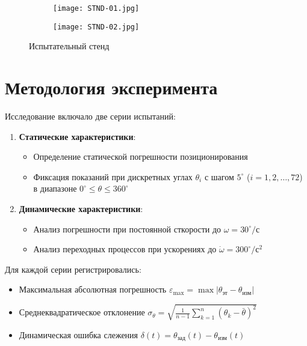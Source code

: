 \begin{figure}[!h]
  \centering
  \begin{subfigure}[b]{0.48\textwidth}
    \centering
    \texttt{[image: STND-01.jpg]} 
    \label{STND01}
  \end{subfigure}
  \hfill
  \begin{subfigure}[b]{0.48\textwidth}
    \centering
    \texttt{[image: STND-02.jpg]} 
    \label{STND02}
  \end{subfigure}

  \caption{Испытательный стенд}
  \label{STND-ISP} 
\end{figure}

\FloatBarrier
\section{Методология эксперимента}
Исследование включало две серии испытаний:

\begin{enumerate}
    \item \textbf{Статические характеристики}: 
    \begin{itemize}
        \item Определение статической погрешности позиционирования
        \item Фиксация показаний при дискретных углах $\theta_i$ с шагом $5^\circ$ ($i = 1, 2, \dots, 72$) в диапазоне $0^\circ \leq \theta \leq 360^\circ$
    \end{itemize}
    
    \item \textbf{Динамические характеристики}:
    \begin{itemize}
        \item Анализ погрешности при постоянной сткорости до $\omega = 30^\circ/\text{с}$
        \item Анализ переходных процессов при ускорениях до $\dot{\omega} = 300^\circ/\text{с}^2$
    \end{itemize}
\end{enumerate}

Для каждой серии регистрировались:
\begin{itemize}
    \item Максимальная абсолютная погрешность $\varepsilon_{\max} = \max|\theta_{\text{эт}} - \theta_{\text{изм}}|$
    \item Среднеквадратическое отклонение $\sigma_\theta = \sqrt{\frac{1}{n-1}\sum_{k=1}^{n}(\theta_k - \bar{\theta})^2}$
    \item Динамическая ошибка слежения $\delta(t) = \theta_{\text{зад}}(t) - \theta_{\text{изм}}(t)$
\end{itemize}

